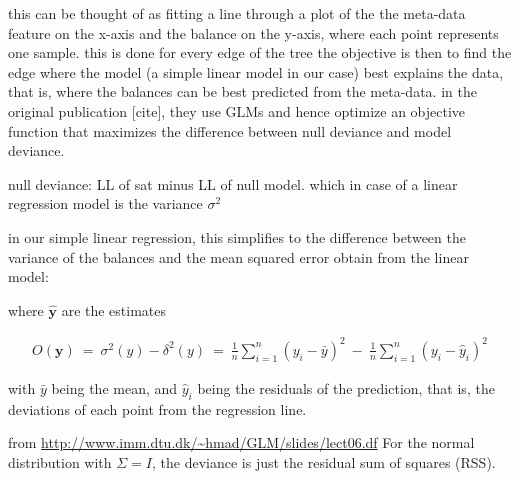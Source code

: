 this can be thought of as fitting a line through a plot of the the meta-data feature on the x-axis and the balance on the y-axis,
where each point represents one sample.
this is done for every edge of the tree
the objective is then to find the edge where the model (a simple linear model in our case) best explains the data,
that is, where the balances can be best predicted from the meta-data.
in the original publication [cite], they use GLMs and hence optimize an objective function that maximizes
the difference between null deviance and model deviance.

null deviance: LL of sat minus LL of null model. which in case of a linear regression model is the variance $\sigma^2$

in our simple linear regression, this simplifies to the difference between the variance of the balances
and the mean squared error obtain from the linear model:



where $\bm{\hat{y}}$ are the estimates

\begin{align*}
    \label{supp:sec:GLM:eq:ObjectiveFunction}
    O(\bm{y}) ~=~ \sigma^2(y) - \delta^2(y)
    ~=~ \frac{1}{n} \sum_{i=1}^{n} \left( y_i - \bar{y} \right)^2
    ~-~ \frac{1}{n} \sum_{i=1}^{n} \left( y_i - \hat{y}_i \right)^2
\end{align*}

with $\bar{y}$ being the mean, and $\hat{y}_i$ being the residuals of the prediction,
that is, the deviations of each point from the regression line.

from \url{http://www.imm.dtu.dk/~hmad/GLM/slides/lect06.df}
For the normal distribution with $\Sigma = I$, the deviance is just the residual sum of squares (RSS).

